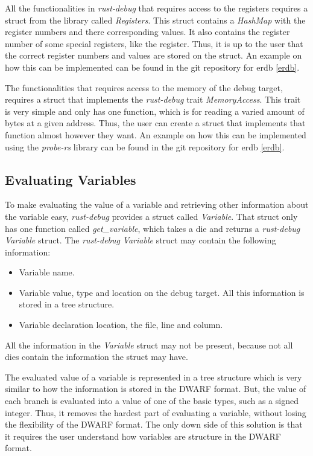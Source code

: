 All the functionalities in \emph{rust-debug} that requires access to the registers requires a struct from the library called \emph{Registers}.
This struct contains a \emph{HashMap} with the register numbers and there corresponding values.
It also contains the register number of some special registers, like the  register.
Thus, it is up to the user that the correct register numbers and values are stored on the struct.  
An example on how this can be implemented can be found in the git repository for \gls{erdb} \ref{erdb}.


The functionalities that requires access to the memory of the debug target, requires a struct that implements the \emph{rust-debug} trait \emph{MemoryAccess}.
This trait is very simple and only has one function, which is for reading a varied amount of bytes at a given address.
Thus, the user can create a struct that implements that function almost however they want.
An example on how this can be implemented using the \emph{probe-rs} library can be found in the git repository for \gls{erdb} \ref{erdb}.



\subsection{Evaluating Variables} \label{sec:ievalvar}
To make evaluating the value of a variable and retrieving other information about the variable easy, \emph{rust-debug} provides a struct called \emph{Variable}.
That struct only has one function called \emph{get_variable}, which takes a \gls{die} and returns a \emph{rust-debug} \emph{Variable} struct.
The \emph{rust-debug} \emph{Variable} struct may contain the following information:


\begin{itemize}
  \item Variable name.
  \item Variable value, type and location on the debug target. All this information is stored in a tree structure.
  \item Variable declaration location, the file, line and column.
\end{itemize}


All the information in the \emph{Variable} struct may not be present, because not all \glspl{die} contain the information the struct may have.


The evaluated value of a variable is represented in a tree structure which is very similar to how the information is stored in the \gls{DWARF} format.
But, the value of each branch is evaluated into a value of one of the basic types, such as a signed integer.
Thus, it removes the hardest part of evaluating a variable, without losing the flexibility of the \gls{DWARF} format.
The only down side of this solution is that it requires the user understand how variables are structure in the \gls{DWARF} format.


